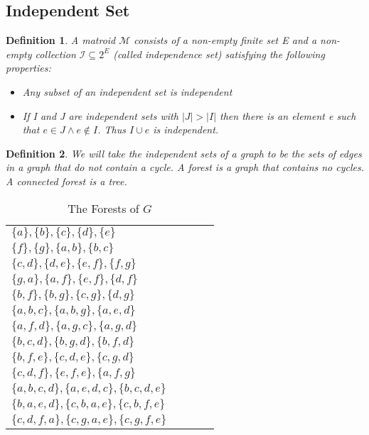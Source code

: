 \documentclass[a4paper, 11pt]{report}
\newtheorem{definition}{Definition}
\theoremstyle{remark}
\begin{document}
\subsection{Independent Set}
    \begin{definition}
        A matroid $\mathcal{M}$ consists of a non-empty finite set E and a non-empty collection $\mathcal{I}\subseteq 2^E$ (called independence set) 
        satisfying the following properties:
        \begin{itemize}
            \item[i] Any subset of an independent set is independent
            \item[ii] If I and J are independent sets with $|J|>|I|$ then there is an element e such that $e\in J \wedge e\notin I$. Thus $I\cup e$ is 
            independent.
        \end{itemize}
    \end{definition}
    \begin{definition}
        We will take the independent sets of a graph to be the sets of edges in a graph that do not contain a cycle. A forest is a graph that contains 
        no cycles. A connected forest is a tree.
    \end{definition}
    \begin{table}[H]
        \centering
        \renewcommand{\arraystretch}{1.2}
        \begin{tabular}{>{\centering\arraybackslash}m{0.8\linewidth}}
            \multicolumn{1}{c}{\Large\textbf{Forests of $G$}}\\
            \cmidrule(lr){1-1}
            $\{a\}, \{b\}, \{c\}, \{d\}, \{e\}$\\
            $\{f\}, \{g\}, \{a,b\}, \{b,c\}$\\
            $\{c,d\}, \{d,e\}, \{e,f\}, \{f,g\}$\\
            $\{g,a\}, \{a,f\}, \{e,f\}, \{d,f\}$\\
            $\{b,f\}, \{b,g\}, \{c,g\}, \{d,g\}$\\
            $\{a,b,c\}, \{a,b,g\}, \{a,e,d\}$\\
            $\{a,f,d\}, \{a,g,c\}, \{a,g,d\}$\\
            $\{b,c,d\}, \{b,g,d\}, \{b,f,d\}$\\
            $\{b,f,e\}, \{c,d,e\}, \{c,g,d\}$\\
            $\{c,d,f\}, \{e,f,e\}, \{a,f,g\}$\\
            $\{a,b,c,d\}, \{a,e,d,c\}, \{b,c,d,e\}$\\
            $\{b,a,e,d\}, \{c,b,a,e\}, \{c,b,f,e\}$\\
            $\{c,d,f,a\}, \{c,g,a,e\}, \{c,g,f,e\}$\\
        \end{tabular}
        \caption{The Forests of $G$}
        \label{tab:forests-G}
    \end{table}

\newpage
\printbibliography
\end{document}
